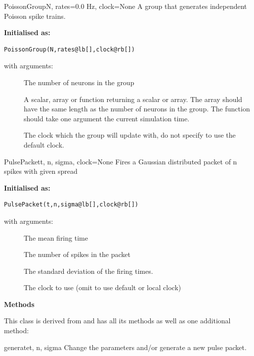 \documentclass[letterpaper,10pt]{manual}
\begin{document}
\hypertarget{brian.PoissonGroup}{}\begin{classdesc}{PoissonGroup}{N, rates=0.0 Hz, clock=None}
A group that generates independent Poisson spike trains.

\textbf{Initialised as:}

\begin{Verbatim}[commandchars=@\[\]]
PoissonGroup(N,rates@lb[],clock@rb[])
\end{Verbatim}

with arguments:
\begin{description}
\item[]
The number of neurons in the group

\item[]
A scalar, array or function returning a scalar or array.
The array should have the same length as the number of
neurons in the group. The function should take one
argument  the current simulation time.

\item[]
The clock which the group will update with, do not
specify to use the default clock.

\end{description}
\end{classdesc}

\hypertarget{brian.PulsePacket}{}\begin{classdesc}{PulsePacket}{t, n, sigma, clock=None}
Fires a Gaussian distributed packet of n spikes with given spread

\textbf{Initialised as:}

\begin{Verbatim}[commandchars=@\[\]]
PulsePacket(t,n,sigma@lb[],clock@rb[])
\end{Verbatim}

with arguments:
\begin{description}
\item[]
The mean firing time

\item[]
The number of spikes in the packet

\item[]
The standard deviation of the firing times.

\item[]
The clock to use (omit to use default or local clock)

\end{description}

\textbf{Methods}

This class is derived from \hyperlink{brian.SpikeGeneratorGroup}{} and has all its
methods as well as one additional method:


\hypertarget{brian.PulsePacket.generate}{}\begin{methoddesc}{generate}{t, n, sigma}
Change the parameters and/or generate a new pulse packet.
\end{methoddesc}
\end{classdesc}
\end{document}
